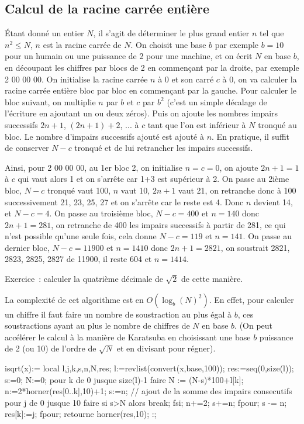 \documentclass[a4paper,11pt]{book}
\begin{document}
\begin{giacjshere}
\subsection{Calcul de la racine carr\'ee enti\`ere}
\'Etant donn\'e un entier $N$, il s'agit de d\'eterminer le plus grand
entier $n$ tel que $n^2\leq N$, $n$ est la racine
carr\'ee de $N$.
On choisit une base $b$ par exemple $b=10$ pour un humain ou une
puissance de 2 pour une machine, et on \'ecrit $N$ en base $b$, en
d\'ecoupant les chiffres par blocs de 2 en commen\c{c}ant par la
droite, par exemple 2 00 00 00. On initialise la racine carr\'ee $n$ \`a 0
et son carr\'e $c$ \`a 0, on va calculer la racine carr\'ee enti\`ere bloc par bloc en
commen\c{c}ant par la gauche. Pour calculer le bloc suivant, on
multiplie $n$ par $b$ et $c$ par $b^2$ (c'est un simple d\'ecalage de
l'\'ecriture en ajoutant un ou deux z\'eros). Puis on ajoute les
nombres impairs successifs $2n+1$, $(2n+1)+2$, ... \`a $c$ tant que l'on est
inf\'erieur \`a $N$ tronqu\'e au bloc. Le nombre d'impairs successifs
ajout\'e est ajout\'e \`a $n$. En pratique, il suffit de conserver
$N-c$ tronqu\'e et de lui retrancher les impairs successifs.

Ainsi, pour 2 00 00 00, au 1er bloc 2, on initialise $n=c=0$, on
ajoute $2n+1=1$ \`a $c$ qui vaut alors 1 et on s'arr\^ete car 1+3
est sup\'erieur \`a 2. On passe au 2i\`eme bloc, $N-c$ tronqu\'e vaut
100, $n$ vaut 10, $2n+1$ vaut 21, on retranche donc \`a 100
successivement 21, 23, 25, 27 et on s'arr\^ete car le reste est
4. Donc $n$ devient 14, et $N-c=4$. On passe au troisi\`eme bloc,
$N-c=400$ et $n=140$ donc $2n+1=281$, on retranche de 400 les impairs
successifs \`a partir de 281, ce qui n'est possible qu'une seule fois,
cela donne $N-c=119$ et $n=141$. On passe au dernier bloc,
$N-c=11900$ et $n=1410$ donc $2n+1=2821$, on soustrait
2821, 2823, 2825, 2827 de 11900, il reste 604 et $n=1414$.

Exercice~: calculer la quatri\`eme d\'ecimale de $\sqrt{2}$ de cette
mani\`ere.

La complexit\'e de cet algorithme est en $O(\log_b(N)^2)$. En effet,
pour calculer un chiffre il faut faire un nombre de soustraction au
plus \'egal \`a $b$, ces soustractions ayant au plus le nombre de
chiffres de $N$ en base $b$.
(On peut acc\'el\'erer le calcul \`a la mani\`ere de Karatsuba en
choisissant une base $b$ puissance de 2 (ou 10) de l'ordre de
$\sqrt{N}$ et en divisant pour r\'egner).

\begin{giacprog}
isqrt(x):={
  local l,j,k,s,n,N,res;
  l:=revlist(convert(x,base,100));
  res:=seq(0,size(l));
  s:=0;
  N:=0;
  pour k de 0 jusque size(l)-1 faire
    N := (N-s)*100+l[k];
    n:=2*horner(res[0..k],10)+1;
    s:=n; // ajout de la somme des impairs consecutifs
    pour j de 0 jusque 10 faire
      si s>N alors break; fsi;
      n+=2;
      s+=n;
    fpour;
    s -= n;
    res[k]:=j;
  fpour;
  retourne horner(res,10);
}:;
\end{giacprog}


\end{giacjshere}
\end{document}
